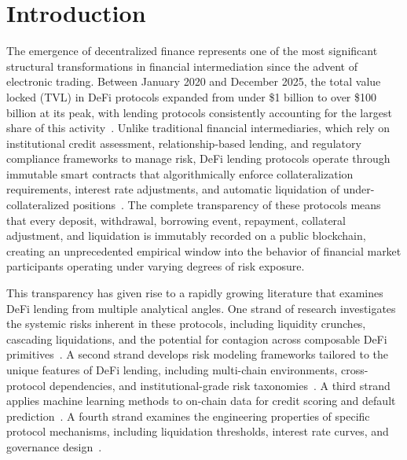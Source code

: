 \section{Introduction}

The emergence of decentralized finance represents one of the most significant structural transformations in financial intermediation since the advent of electronic trading. Between January 2020 and December 2025, the total value locked (TVL) in DeFi protocols expanded from under \$1 billion to over \$100 billion at its peak, with lending protocols consistently accounting for the largest share of this activity~\cite{schar2021decentralized2, jiang2023defi}. Unlike traditional financial intermediaries, which rely on institutional credit assessment, relationship-based lending, and regulatory compliance frameworks to manage risk, DeFi lending protocols operate through immutable smart contracts that algorithmically enforce collateralization requirements, interest rate adjustments, and automatic liquidation of under-collateralized positions~\cite{gudgeon2020defi}. The complete transparency of these protocols means that every deposit, withdrawal, borrowing event, repayment, collateral adjustment, and liquidation is immutably recorded on a public blockchain, creating an unprecedented empirical window into the behavior of financial market participants operating under varying degrees of risk exposure.

This transparency has given rise to a rapidly growing literature that examines DeFi lending from multiple analytical angles. One strand of research investigates the systemic risks inherent in these protocols, including liquidity crunches, cascading liquidations, and the potential for contagion across composable DeFi primitives~\cite{qin2021empirical, perez2020liquidations}. A second strand develops risk modeling frameworks tailored to the unique features of DeFi lending, including multi-chain environments, cross-protocol dependencies, and institutional-grade risk taxonomies~\cite{oberholzer2026toward, sevim2026interoperability}. A third strand applies machine learning methods to on-chain data for credit scoring and default prediction~\cite{ghosh2024onchain}. A fourth strand examines the engineering properties of specific protocol mechanisms, including liquidation thresholds, interest rate curves, and governance design~\cite{iftikhar2025automated, tovanich2023contagion}. 

